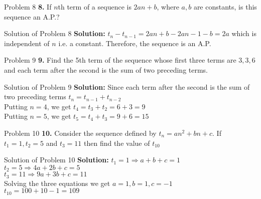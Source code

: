 \documentclass[aspectratio=1610,8pt]{beamer}
\begin{document}
\begin{frame}{Problem 8}
  \textbf{8.} If $n$th term of a sequence is $2an + b$, where $a, b$ are
  constants, is this sequence an A.P.?
\end{frame}
\begin{frame}{Solution of Problem 8}
  \textbf{Solution:} $t_n - t_{n - 1} = 2an + b - 2a{n - 1} - b = 2a$ which is
  independent of $n$ i.e. a constant. Therefore, the sequence is an A.P.
\end{frame}
\begin{frame}{Problem 9}
  \textbf{9.} Find the 5th term of the sequence whose first three terms are $3,
  3, 6$ and each term after the second is the sum of two preceding terms.
\end{frame}
\begin{frame}{Solution of Problem 9}
  \textbf{Solution:} Since each term after the second is the sum of two preceding terms $t_n =
  t_{n - 1} + t_{n - 2}$\\
  Putting $n=4$, we get $t_4 = t_3 + t_2 = 6 + 3 = 9$\\
  Putting $n=5$, we get $t_5 = t_4 + t_3 = 9 + 6 = 15$
\end{frame}
\begin{frame}{Problem 10}
  \textbf{10.} Consider the sequence defined by $t_n = an^2 + bn + c$. If $t_1
  = 1, t_2 = 5$ and $t_3 = 11$ then find the value of $t_{10}$
\end{frame}
\begin{frame}{Solution of Problem 10}
  \textbf{Solution:} $t_1 = 1 \Rightarrow a + b + c = 1$\\
  $t_2 = 5 \Rightarrow 4a + 2b + c = 5$\\
  $t_3 = 11 \Rightarrow 9a + 3b + c = 11$\\
  Solving the three equations we get $a = 1, b = 1,c = -1$\\
  $t_{10} = 100 + 10 - 1 = 109$
\end{frame}
\end{document}
